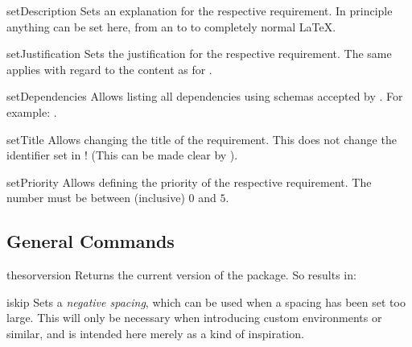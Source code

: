 \documentclass{sopra-base}
\begin{document}
\begin{command}{setDescription}{}
    Sets an explanation for the respective requirement. In principle anything can be set here, from an  to  to completely normal LaTeX.
\end{command}

\begin{command}{setJustification}{}
    Sets the justification for the respective requirement. The same applies with regard to the content as for .
\end{command}

\begin{command}{setDependencies}{}
    Allows listing all dependencies using schemas accepted by . For example: .
\end{command}

\begin{command}{setTitle}{}
    Allows changing the title of the requirement. This does not change the identifier set in ! (This can be made clear by ).
\end{command}


\begin{command}{setPriority}{}
    Allows defining the priority of the respective requirement. The number must be between (inclusive) \(0\) and \(5\).
\end{command}

\subsection{General Commands}

\begin{command}{thesorversion}{}
    Returns the current version of the package. So  results in: \thesorversion\\
\end{command}

\begin{command}{iskip}{}
    Sets a \emph{negative spacing}, which can be used when a spacing has been set too large. This will only be necessary when introducing custom environments or similar, and is intended here merely as a kind of inspiration.
\end{command}
\end{document}
